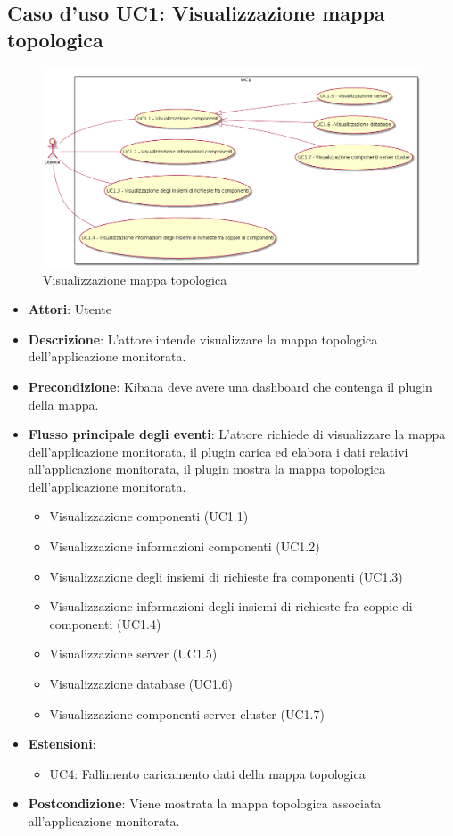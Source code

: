  \hypertarget{UC1}{}
\subsection{Caso d'uso UC1: Visualizzazione mappa topologica}
\begin{figure} [H]
	\centering
	\includegraphics[scale=0.40]{./UC/UC1.png}
	\caption{Visualizzazione mappa topologica}\label{}
\end{figure}
\begin{itemize}
	\item \textbf{Attori}: Utente
	\item \textbf{Descrizione}: L'attore intende visualizzare la mappa topologica dell'applicazione monitorata.
	\item \textbf{Precondizione}: Kibana deve avere una dashboard che contenga il plugin della mappa.
	\item \textbf{Flusso principale degli eventi}: L'attore richiede di visualizzare la mappa dell'applicazione monitorata, il plugin carica ed elabora i dati relativi all'applicazione monitorata, il plugin mostra la mappa topologica dell'applicazione monitorata.
	\begin{itemize}
		\item Visualizzazione componenti (UC1.1)
		\item Visualizzazione informazioni componenti (UC1.2)
		\item Visualizzazione degli insiemi di richieste fra componenti (UC1.3)
		\item Visualizzazione informazioni degli insiemi di richieste fra coppie di componenti (UC1.4)
		\item Visualizzazione server (UC1.5)
		\item Visualizzazione database (UC1.6)
		\item Visualizzazione componenti server cluster (UC1.7)
	\end{itemize}
	\item 	\textbf{Estensioni}:
	\begin{itemize}
		\item UC4: Fallimento caricamento dati della mappa topologica
	\end{itemize}
	\item \textbf{Postcondizione}: Viene mostrata la mappa topologica associata all'applicazione monitorata.
\end{itemize}

